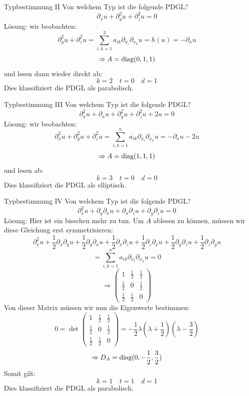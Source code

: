 \begin{Beispiel}{Typbestimmung II}
    Von welchem Typ ist die folgende PDGL?
    $$\partial_x u + \partial_y^2 u +\partial_z^2 u = 0$$
    Lösung: wir beobachten:
    $$\partial_y^2 u + \partial_z^2 u = \sum_{i,k=1}^3 a_{ik}\partial_{x_i}\partial_{x_k}u = h(u)=-\partial_x u$$
    $$\Rightarrow A=\text{diag}(0,1,1)$$
    und lesen dann wieder direkt ab:
    $$k=2\quad t= 0 \quad d=1$$
    Dies klassifiziert die PDGL als parabolisch.
\end{Beispiel}
\begin{Beispiel}{Typbestimmung III}
      Von welchem Typ ist die folgende PDGL?
    $$\partial_x^2 u + \partial_x u +\partial_y^2 u + \partial_z^2 u + 2u = 0$$
    Lösung: wir beobachten:
    $$\partial_x^2 u + \partial_y^2 u + \partial_z^2 u = \sum_{i,k=1}^n a_{ik}\partial_{x_i}\partial_{x_n}u=-\partial_x u - 2u$$
    $$\Rightarrow A=\text{diag}(1,1,1)$$
    und lesen ab:
    $$k=3\quad t=0 \quad d=0$$
    Dies klassifiziert die PDGL als elliptisch.
\end{Beispiel}
\begin{Beispiel}{Typbestimmung IV}
    Von welchem Typ ist die folgende PDGL?
    $$\partial_x^2 u+\partial_y\partial_x u+\partial_x\partial_z u+\partial_y\partial_z u = 0$$
    Lösung: Hier ist ein bisschen mehr zu tun. Um $A$ ablesen zu können, müssen wir diese Gleichung erst symmetrisieren:
    $$\partial_x^2 u+\frac{1}{2}\partial_x\partial_y u + \frac{1}{2}\partial_y\partial_x u + \frac{1}{2}\partial_x\partial_z u+ \frac{1}{2}\partial_z\partial_x u+\frac{1}{2}\partial_y\partial_z u + \frac{1}{2}\partial_z\partial_y u$$
    $$=\sum_{i,k=1}^n a_{ik}\partial_{x_i}\partial_{x_u}u = 0$$
    $$\Rightarrow \begin{pmatrix} 1 & \frac{1}{2} & \frac{1}{2}\\ \frac{1}{2} & 0 & \frac{1}{2} \\ \frac{1}{2} & \frac{1}{2} & 0\end{pmatrix}$$
    Von dieser Matrix müssen wir nun die Eigenwerte bestimmen:
    $$0=\det\begin{pmatrix} 1 & \frac{1}{2} & \frac{1}{2}\\ \frac{1}{2} & 0 & \frac{1}{2} \\ \frac{1}{2} & \frac{1}{2} & 0\end{pmatrix}=-\frac{1}{2}\lambda(\lambda+\frac{1}{2})(\lambda-\frac{3}{2})$$
    $$\Rightarrow D_A=\text{diag}(0, -\frac{1}{2}, \frac{3}{2})$$
    Somit gilt:
    $$k=1 \quad t=1 \quad d=1$$
    Dies klassifiziert die PDGL als parabolisch.
\end{Beispiel}

